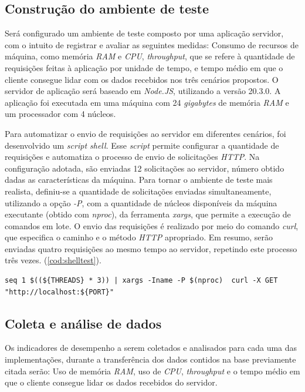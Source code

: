 \documentclass[12pt]{article}
\begin{document}
\subsection{Construção do ambiente de teste}

Será configurado um ambiente de teste composto por uma aplicação servidor, com o intuito de registrar e avaliar as seguintes medidas:
Consumo de recursos de máquina, como memória \textit{RAM} e \textit{CPU}, \textit{throughput}, que se refere à quantidade de requisições feitas à aplicação por unidade de tempo,
e tempo médio em que o cliente consegue lidar com os dados recebidos nos três cenários propostos. 
O servidor de aplicação será baseado em \textit{Node.JS}, utilizando a versão 20.3.0. A aplicação foi executada em uma máquina
com 24 \textit{gigabytes} de memória \textit{RAM} e um processador com 4 núcleos.

Para automatizar o envio de requisições ao servidor em diferentes cenários, 
foi desenvolvido um \textit{script shell}. Esse \textit{script} permite configurar a quantidade de 
requisições e automatiza o processo de envio de solicitações \textit{HTTP}. Na configuração adotada,
são enviadas 12 solicitações ao servidor, número obtido dadas as características da máquina. 
Para tornar o ambiente de teste mais realista, definiu-se a quantidade de solicitações enviadas simultaneamente, 
utilizando a opção \textit{-P}, com a quantidade de núcleos disponíveis da máquina executante (obtido com \textit{nproc}), 
da ferramenta \textit{xargs}, que permite a execução de comandos em lote. O envio 
das requisições é realizado por meio do comando \textit{curl}, que especifica o caminho e o método \textit{HTTP} apropriado.
Em resumo, serão enviadas quatro requisições ao mesmo tempo ao servidor, repetindo este processo três vezes. (\autoref{cod:shelltest}).

\begin{lstlisting}[caption={\textit{Script} para disparo de requisições}, label=cod:shelltest]
	seq 1 $((${THREADS} * 3)) | xargs -Iname -P $(nproc)  curl -X GET "http://localhost:${PORT}"
\end{lstlisting}


\subsection{Coleta e análise de dados}

Os indicadores de desempenho a serem coletados e analisados para cada uma das implementações, durante a transferência
dos dados contidos na base previamente citada serão: Uso de memória \textit{RAM}, uso de \textit{CPU}, \textit{throughput}
e o tempo médio em que o cliente consegue lidar os dados recebidos do servidor.
\end{document}
